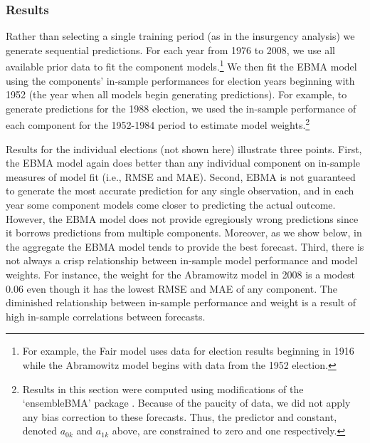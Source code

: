 \documentclass[pdftex,12pt,fullpage,oneside]{amsart}
\begin{document}
\subsubsection{Results}

Rather than selecting a single training period (as in the insurgency
analysis) we generate sequential predictions.  For each year from 1976
to 2008, we use all available prior data to fit the component
models.\footnote{For example, the Fair model uses data for election
  results beginning in 1916 while the Abramowitz model begins with
  data from the 1952 election. }  We then fit the EBMA model using the
components' in-sample performances for election years beginning with
1952 (the year when all models begin generating predictions).  For
example, to generate predictions for the 1988 election, we used the
in-sample performance of each component for the 1952-1984 period to
estimate model weights.\footnote{Results in this section were computed
  using modifications of the `ensembleBMA' package
  \citep{Fraley:2010b, Fraley:Forthcoming}.  Because of the paucity of
  data, we did not apply any bias correction to these forecasts.  Thus,
  the predictor and constant, denoted $a_{0k}$ and $a_{1k}$ above, are
  constrained to zero and one respectively.}

Results for the individual elections (not shown here) illustrate three
points.  First, the EBMA model again does better than any individual
component on in-sample measures of model fit (i.e., RMSE and MAE).
Second, EBMA is not guaranteed to generate the most accurate
prediction for any single observation, and in each year some component
models come closer to predicting the actual outcome.  However, the
EBMA model does not provide egregiously wrong predictions since it
borrows predictions from multiple components.  Moreover, as we show
below, in the aggregate the EBMA model tends to provide the best
forecast.  Third, there is not always a crisp relationship between
in-sample model performance and model weights.  For instance, the
weight for the Abramowitz model in 2008 is a modest 0.06 even though
it has the lowest RMSE and MAE of any component.  The diminished
relationship between in-sample performance and weight is a result of
high in-sample correlations between forecasts.  %
\end{document}
